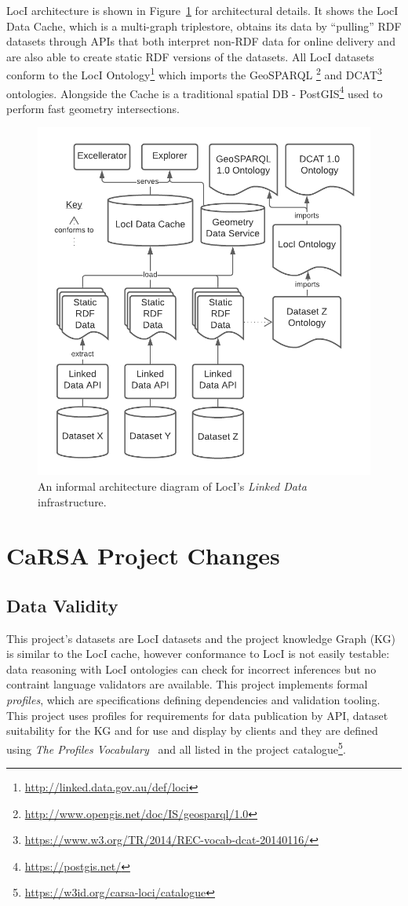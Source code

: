 \documentclass[runningheads]{llncs}
\begin{document}
LocI architecture is shown in Figure~\ref{fig:loci-arch} for architectural details. It shows the LocI Data Cache, which is a multi-graph triplestore, 
obtains its data by ``pulling'' RDF datasets through APIs that both interpret non-RDF data for online delivery and are also able to create static RDF 
versions of the datasets. All LocI datasets conform to the LocI Ontology\footnote{\url{http://linked.data.gov.au/def/loci}} which imports the GeoSPARQL
\footnote{\url{http://www.opengis.net/doc/IS/geosparql/1.0}} and DCAT\footnote{\url{https://www.w3.org/TR/2014/REC-vocab-dcat-20140116/}} ontologies. 
Alongside the Cache is a traditional spatial DB - PostGIS\footnote{\url{https://postgis.net/}} used to perform fast geometry intersections.

\begin{figure}[htb]
    \centering
    \includegraphics[width=0.8\linewidth]{images/loci-arch.png}
    \caption{An informal architecture diagram of LocI's \textit{Linked Data} infrastructure.}
    \label{fig:loci-arch}
\end{figure}

\section{CaRSA Project Changes}\label{sec:changes}
\subsection{Data Validity}
This project's datasets are LocI datasets and the project knowledge Graph (KG) is similar to the LocI cache, however conformance to LocI is not easily
 testable: data reasoning with LocI ontologies can check for incorrect inferences but no contraint language validators are available. This project implements formal \textit{profiles}, which 
are specifications defining dependencies and validation tooling. This project uses profiles for requirements for data 
publication by API, dataset suitability for the KG and for use and display by clients and they are defined using 
\textit{The Profiles Vocabulary}~\cite{atkinson_profiles_2020} and all listed in the project catalogue\footnote{\label{catalogue} \url{https://w3id.org/carsa-loci/catalogue}}.
\end{document}
